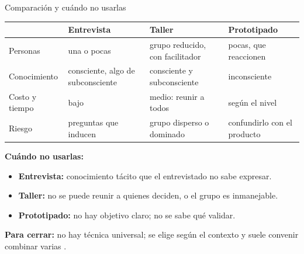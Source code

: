\begin{frame}{Comparación y cuándo no usarlas}
  \footnotesize
  \renewcommand{\arraystretch}{1.1}
  \begin{tabular}{@{}p{2.1cm}p{3.4cm}p{3.6cm}p{3.4cm}@{}}
    \toprule
     & \textbf{Entrevista} & \textbf{Taller} & \textbf{Prototipado} \\
    \midrule
    Personas & una o pocas & grupo reducido, con facilitador & pocas, que reaccionen \\
    Conocimiento & consciente, algo de subconsciente & consciente y subconsciente & inconsciente \\
    Costo y tiempo & bajo & medio: reunir a todos & según el nivel \\
    Riesgo & preguntas que inducen & grupo disperso o dominado & confundirlo con el producto \\
    \bottomrule
  \end{tabular}

  \vspace{2pt}
  \textbf{Cuándo no usarlas:}
  \begin{itemize}
    \item \textbf{Entrevista:} conocimiento tácito que el entrevistado no sabe expresar.
    \item \textbf{Taller:} no se puede reunir a quienes deciden, o el grupo es inmanejable.
    \item \textbf{Prototipado:} no hay objetivo claro; no se sabe qué validar.
  \end{itemize}
  \textbf{Para cerrar:} no hay técnica universal; se elige según el contexto y suele convenir combinar varias \cite[p.~35]{ireb2026}.
\end{frame}
